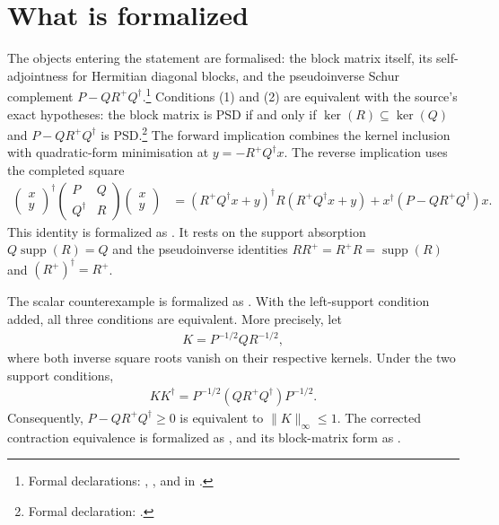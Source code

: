 \documentclass{article}
\begin{document}
\section{What is formalized}
The objects entering the statement are formalised: the block matrix itself,
its self-adjointness for Hermitian diagonal blocks, and the pseudoinverse
Schur complement $P - Q R^{+} Q^\dagger$.\footnote{Formal declarations:
, ,
and  in
.}
Conditions (1) and (2) are equivalent with the source's exact hypotheses:
the block matrix is PSD if and only if $\ker(R)\subseteq\ker(Q)$ and
$P-QR^+Q^\dagger$ is PSD.\footnote{Formal declaration:
.}
The forward implication combines the kernel inclusion
 with quadratic-form
minimisation at $y=-R^+Q^\dagger x$. The reverse implication uses the completed
square
\begin{align}
  \begin{pmatrix}x\\y\end{pmatrix}^{\!\dagger}
  \begin{pmatrix}P&Q\\Q^\dagger&R\end{pmatrix}
  \begin{pmatrix}x\\y\end{pmatrix}
  &=(R^+Q^\dagger x+y)^\dagger R(R^+Q^\dagger x+y)
    +x^\dagger(P-QR^+Q^\dagger)x.
\end{align}
This identity is formalized as
. It rests on the
support absorption $Q\operatorname{supp}(R)=Q$ and the pseudoinverse identities
$RR^+=R^+R=\operatorname{supp}(R)$ and $(R^+)^\dagger=R^+$.

The scalar counterexample is formalized as
. With the
left-support condition added, all three conditions are equivalent. More
precisely, let
\begin{align}
  K=P^{-1/2}QR^{-1/2},
\end{align}
where both inverse square roots vanish on their respective kernels. Under the
two support conditions,
\begin{align}
  KK^\dagger
    =P^{-1/2}(QR^+Q^\dagger)P^{-1/2}.
\end{align}
Consequently, $P-QR^+Q^\dagger\ge0$ is equivalent to $\lVert K\rVert_\infty\le1$.
The corrected contraction equivalence is formalized as
, and its
block-matrix form as
.
\end{document}
